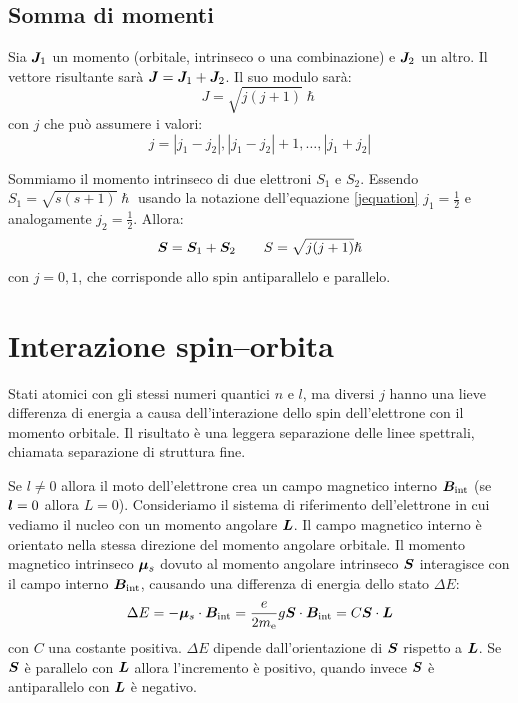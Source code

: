 \subsection{Somma di momenti}
Sia $\boldsymbol{J}_1$ un momento (orbitale, intrinseco o una combinazione) e $\boldsymbol{J}_2$ un altro. Il vettore risultante sarà $\boldsymbol{J}=\boldsymbol{J}_1+\boldsymbol{J}_2$. Il suo modulo sarà:
\begin{equation}
	J=\sqrt{j(j+1)}\hslash
\end{equation}
con $j$ che può assumere i valori:
\begin{equation}
	j=|j_1-j_2|,|j_1-j_2|+1,\ldots,|j_1+j_2|
	\label{jequation}
\end{equation}
\begin{Es}
	Sommiamo il momento intrinseco di due elettroni $S_1$ e $S_2$. Essendo $S_1=\sqrt{s(s+1)}\hslash$ usando la notazione dell'equazione \eqref{jequation} $j_1=\frac{1}{2}$ e analogamente $j_2=\frac{1}{2}$. Allora:
	\[
		\boldsymbol{S}=\boldsymbol{S}_1+\boldsymbol{S}_2\qquad S=\sqrt{j(j+1)}\hslash
	\]
	con $j=0,1$, che corrisponde allo spin antiparallelo e parallelo.
\end{Es}
\section{Interazione spin--orbita}
Stati atomici con gli stessi numeri quantici $n$ e $l$, ma diversi $j$ hanno una lieve differenza di energia a causa dell'interazione dello spin dell'elettrone con il momento orbitale. Il risultato è una leggera separazione delle linee spettrali, chiamata separazione di struttura fine.

Se $l\neq 0$ allora il moto dell'elettrone crea un campo magnetico interno $\boldsymbol{B}_\text{int}$ (se $\boldsymbol{l}=0$ allora $L=0$). Consideriamo il sistema di riferimento dell'elettrone in cui vediamo il nucleo con un momento angolare $\boldsymbol{L}$. Il campo magnetico interno è orientato nella stessa direzione del momento angolare orbitale. Il momento magnetico intrinseco $\boldsymbol{\mu}_s$ dovuto al momento angolare intrinseco $\boldsymbol{S}$ interagisce con il campo interno $\boldsymbol{B}_\text{int}$, causando una differenza di energia dello stato $\Delta E$:
\begin{equation}
	\Delta E=-\boldsymbol{\mu}_s\cdot\boldsymbol{B}_\text{int}=\frac{e}{2m_{\mathrm{e}}}g\boldsymbol{S}\cdot\boldsymbol{B}_\text{int}=C\boldsymbol{S}\cdot\boldsymbol{L}
\end{equation}
con $C$ una costante positiva. $\Delta E$ dipende dall'orientazione di $\boldsymbol{S}$ rispetto a $\boldsymbol{L}$. Se $\boldsymbol{S}$ è parallelo con $\boldsymbol{L}$ allora l'incremento è positivo, quando invece $\boldsymbol{S}$ è antiparallelo con $\boldsymbol{L}$ è negativo.

